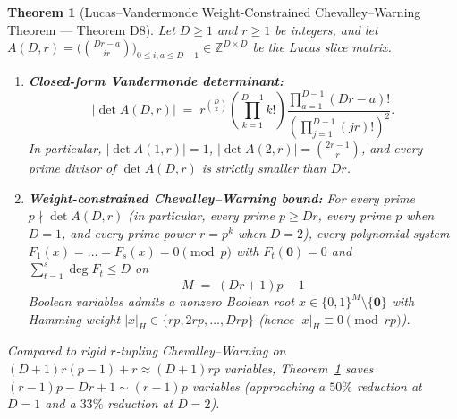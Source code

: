 \documentclass[11pt,a4paper]{article}
\newtheorem{theorem}{Theorem}[section]
\theoremstyle{definition}
\newcommand{\Z}{\mathbb{Z}}
\begin{document}
\begin{theorem}[Lucas--Vandermonde Weight-Constrained Chevalley--Warning Theorem --- Theorem D8]
\label{thm:d8}
Let $D \ge 1$ and $r \ge 1$ be integers, and let $A(D, r) = \bigl(\binom{Dr - a}{ir}\bigr)_{0 \le i, a \le D - 1} \in \Z^{D \times D}$ be the Lucas slice matrix.
\begin{enumerate}[leftmargin=*,nosep]
  \item \textbf{Closed-form Vandermonde determinant:}
  \[
    |\det A(D, r)|
    \;=\; r^{\binom{D}{2}} \left(\prod_{k=1}^{D-1} k!\right)
          \frac{\prod_{a=1}^{D-1} (Dr - a)!}{\left(\prod_{j=1}^{D-1} (jr)!\right)^2}.
  \]
  In particular, $|\det A(1, r)| = 1$, $|\det A(2, r)| = \binom{2r - 1}{r}$, and every prime divisor of $\det A(D, r)$ is strictly smaller than $Dr$.
  \item \textbf{Weight-constrained Chevalley--Warning bound:} For every prime $p \nmid \det A(D, r)$ (in particular, every prime $p \ge Dr$, every prime $p$ when $D = 1$, and every prime power $r = p^k$ when $D = 2$), every polynomial system $F_1(x) = \dots = F_s(x) = 0 \pmod p$ with $F_t(\mathbf{0}) = 0$ and $\sum_{t=1}^s \deg F_t \le D$ on
  \[
    M \;=\; (Dr + 1)p - 1
  \]
  Boolean variables admits a nonzero Boolean root $x \in \{0, 1\}^M \setminus \{\mathbf{0}\}$ with Hamming weight $|x|_H \in \{rp, 2rp, \dots, Drp\}$ (hence $|x|_H \equiv 0 \pmod{rp}$).
\end{enumerate}
Compared to rigid $r$-tupling Chevalley--Warning on $(D+1)r(p-1) + r \approx (D+1)rp$ variables, Theorem~\ref{thm:d8} saves $(r - 1)p - Dr + 1 \sim (r - 1)p$ variables (approaching a $50\%$ reduction at $D = 1$ and a $33\%$ reduction at $D = 2$).
\end{theorem}
\end{document}

